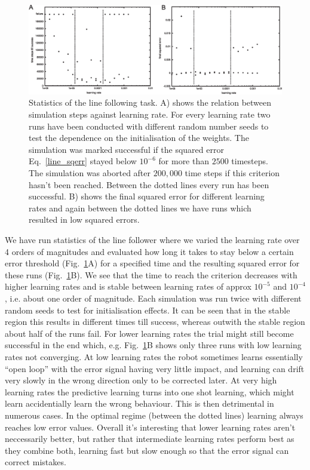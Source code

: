 \documentclass{llncs}
\begin{document}
\begin{figure}[h!]
  \centering
  \includegraphics[width=\columnwidth]{line_stats}
  \caption{Statistics of the line following task. A) shows the relation between
    simulation steps against learning rate. For every learning rate two runs have
    been conducted with different random number seeds to test the dependence on the
    initialisation of the weights. The simulation was marked successful if the
    squared error Eq.~\ref{line_sqerr} stayed below $10^{-6}$ for more than $2500$
    timesteps. The simulation was aborted after $200,000$ time steps if this criterion
    hasn't been reached. Between the dotted lines every run has been successful.
    B) shows the final squared error for different learning rates and again between
    the dotted lines we have runs which resulted in low squared errors.
    \label{line_stats}}
\end{figure}

We have run statistics of the line follower where we varied the learning
rate over 4 orders of magnitudes and evaluated how long it takes to stay
below a certain error threshold (Fig.~\ref{line_stats}A) for a specified
time and the resulting squared error for these runs (Fig.~\ref{line_stats}B).
We see that the time to reach the criterion decreases with higher learning
rates and is stable between learning rates of approx $10^{-5}$ and $10^{-4}$,
i.e. about one order of magnitude. Each simulation was run twice with different random seeds to test for initialisation effects. It can be seen that in the stable region this results
in different times till success, whereas outwith the stable region about
half of the runs fail. For lower learning rates the trial might still become successful
in the end which, e.g. Fig.~\ref{line_stats}B shows only three runs with low learning rates not converging. At low learning rates the robot sometimes learns essentially
``open loop'' with the error signal having very little impact, and learning
can drift very slowly in the wrong direction only to be corrected later.
At very high learning rates the predictive learning turns into one shot
learning, which might learn accidentially learn the wrong behaviour. This is
then detrimental in numerous cases. In the optimal regime (between the dotted lines)
learning always reaches low error values. Overall it's interesting that lower
learning rates aren't neccessarily better, but rather that intermediate learning rates
perform best as they combine both, learning fast but slow enough so that the error
signal can correct mistakes.
\end{document}
